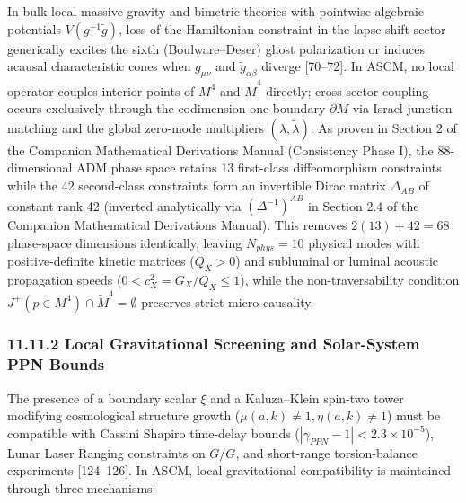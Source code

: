 \documentclass[aps,prd,onecolumn,superscriptaddress,nofootinbib,longbibliography,10pt]{revtex4-2}
\begin{document}
  In bulk-local massive gravity and bimetric theories with pointwise algebraic potentials \(V(g^{-1}\tilde{g})\), loss of the Hamiltonian constraint in the lapse-shift sector generically excites the sixth (Boulware–Deser) ghost polarization or induces acausal characteristic cones when \(g_{\mu\nu}\) and \(\tilde{g}_{\alpha\beta}\) diverge [70–72]. In ASCM, no local operator couples interior points of \(M^4\) and \(\tilde{M}^4\) directly; cross-sector coupling occurs exclusively through the codimension-one boundary \(\partial M\) via Israel junction matching and the global zero-mode multipliers \((\lambda, \tilde{\lambda})\). As proven in Section 2 of the Companion Mathematical Derivations Manual (Consistency Phase I), the 88-dimensional ADM phase space retains 13 first-class diffeomorphism constraints while the 42 second-class constraints form an invertible Dirac matrix \(\Delta_{AB}\) of constant rank 42 (inverted analytically via \((\Delta^{-1})^{AB}\) in Section 2.4 of the Companion Mathematical Derivations Manual). This removes \(2(13) + 42 = 68\) phase-space dimensions identically, leaving \(N_{phys} = 10\) physical modes with positive-definite kinetic matrices (\(Q_X > 0\)) and subluminal or luminal acoustic propagation speeds (\(0 < c_X^2 = G_X/Q_X \le 1\)), while the non-traversability condition \(J^+(p \in M^4) \cap \tilde{M}^4 = \emptyset\) preserves strict micro-causality.


  
\subsubsection*{11.11.2 Local Gravitational Screening and Solar-System PPN Bounds}

  The presence of a boundary scalar \(\xi\) and a Kaluza–Klein spin-two tower modifying cosmological structure growth (\(\mu(a,k) \neq 1, \eta(a,k) \neq 1\)) must be compatible with Cassini Shapiro time-delay bounds (\(|\gamma_{PPN} - 1| < 2.3 \times 10^{-5}\)), Lunar Laser Ranging constraints on \(\dot{G}/G\), and short-range torsion-balance experiments [124–126]. In ASCM, local gravitational compatibility is maintained through three mechanisms:
\end{document}
